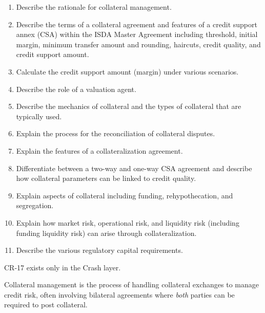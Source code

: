 
\begin{crkeybox}
\begin{enumerate}[label=\textbf{\alph*.},leftmargin=2em]
\item Describe the rationale for collateral management.
\item Describe the terms of a collateral agreement and features of a credit support annex (CSA) within the ISDA Master Agreement including threshold, initial margin, minimum transfer amount and rounding, haircuts, credit quality, and credit support amount.
\item Calculate the credit support amount (margin) under various scenarios.
\item Describe the role of a valuation agent.
\item Describe the mechanics of collateral and the types of collateral that are typically used.
\item Explain the process for the reconciliation of collateral disputes.
\item Explain the features of a collateralization agreement.
\item Differentiate between a two-way and one-way CSA agreement and describe how collateral parameters can be linked to credit quality.
\item Explain aspects of collateral including funding, rehypothecation, and segregation.
\item Explain how market risk, operational risk, and liquidity risk (including funding liquidity risk) can arise through collateralization.
\item Describe the various regulatory capital requirements.
\end{enumerate}
\end{crkeybox}

\begin{crtrapbox}
CR-17 exists only in the Crash layer.
\end{crtrapbox}


Collateral management is the process of handling collateral exchanges to manage
credit risk, often involving bilateral agreements where \emph{both} parties can be
required to post collateral.

